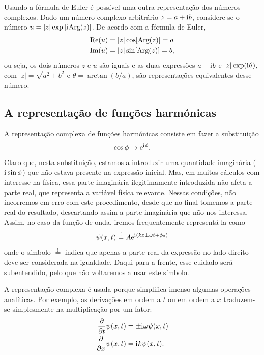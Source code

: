 Usando a fórmula de Euler é possível uma outra representação dos números
complexos. Dado um número complexo arbitrário $ z=a+\text{i}\mkern1mu b$, considere-se o
número $ u = | z|\exp\left[\text{i}\mkern1mu\text{Arg}( z)\right]$. De
acordo com a fórmula de Euler, 
\begin{align*}
  \text{Re}( u)&=| z|\cos[\text{Arg}( z)]=a\\
  \text{Im}( u)&=| z|\sin[\text{Arg}( z)]=b,
\end{align*}
ou seja, os dois números $ z$ e $ u$ são iguais e as duas expressões
$a+\text{i}\mkern1mu b$ e $| z|\exp(\text{i}\mkern1mu\theta)$, com
$| z|=\sqrt{a^2+b^2}$ e $\theta=\arctan(b/a)$, são representações
equivalentes desse número.

\subsection{A representação de funções harmónicas}
\label{sec:complexharm}
A representação complexa de funções harmónicas consiste em fazer a substituição
\begin{equation*}
  \cos\phi \rightarrow \text{e}^{\text{i}\mkern1mu \phi}.
\end{equation*}
Claro que, nesta substituição, estamos a introduzir uma quantidade imaginária
($\text{i}\mkern1mu\sin\phi$) que não estava presente na expressão inicial. Mas, em muitos
cálculos com interesse na física, essa parte imaginária ilegitimamente
introduzida não afeta a parte real, que representa a variável física relevante.
Nessas condições, não incorremos em erro com este procedimento, desde que no
final tomemos a parte real do resultado, descartando assim a parte imaginária
que não nos interessa. Assim, no caso da função de onda, iremos frequentemente
representá-la como
\begin{equation*}
  \psi(x,t)\stackrel{!}{=}A\text{e}^{\text{i}\mkern1mu(kx\pm\omega t+\phi_0)}
\end{equation*}
onde o símbolo $\stackrel{!}{=}$ indica que apenas a parte real da expressão no
lado direito deve ser considerada na igualdade. Daqui para a frente, esse
cuidado será subentendido, pelo que não voltaremos a usar este símbolo.

A representação complexa é usada porque simplifica imenso algumas operações
analíticas. Por exemplo, as derivações em ordem a $t$ ou em ordem a $x$
traduzem-se simplesmente na multiplicação por um fator:
\begin{align*}
  \frac{\partial }{\partial t}\psi(x,t)&=\pm\text{i}\mkern1mu\omega\psi(x,t)\\
  \frac{\partial }{\partial x}\psi(x,t)&=\text{i}\mkern1mu k\psi(x,t).
\end{align*}

